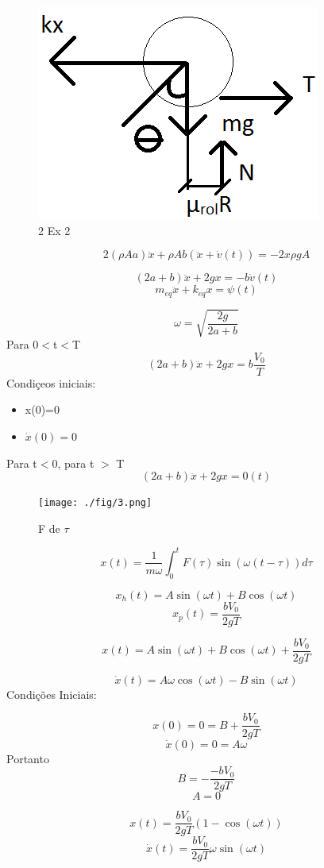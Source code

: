 \documentclass[a4paper, 12pt]{article}
\begin{document}
\begin{figure}[h]
\begin{center}
\includegraphics[scale=0.16]{./fig/2.png}
\caption{\label{fig:1}2 Ex 2} 
\end{center}
\end{figure}

\[2(\rho A a)\ddot{x}+\rho A b(\ddot{x}+\dot{v}(t))=-2x\rho gA\]

\[(2a+b)\ddot{x}+2gx=-b\dot{v}(t)\]
\[m_{eq}\ddot{x}+k_{eq}x=\psi(t)\]

\[\omega = \sqrt{\frac{2g}{2a+b}}\]
Para 0$<$t$<$T
\[(2a+b)\ddot{x}+2gx=b\frac{V_{0}}{T}\]
Condiçeos iniciais:
\begin{itemize}
\item x(0)=0

\item $\dot{x}(0)=0$
\end{itemize}
Para t$<$0, para t $>$ T
\[(2a+b)\ddot{x}+2gx=0(t)\]
\begin{figure}[h]
\begin{center}
\texttt{[image: ./fig/3.png]}
\caption{\label{fig:1} F de $\tau$} 
\end{center}
\end{figure}

\[x(t)=\frac{1}{m\omega} \int _{0}^{t} {F(\tau)\sin(\omega(t-\tau))d\tau}\]

\[x_{h}(t)=A\sin(\omega t)+B\cos(\omega t)\]
\[x_{p}(t)=\frac{bV_{0}}{2gT}\]

\[x(t)=A\sin(\omega t)+B\cos(\omega t)+\frac{bV_{0}}{2gT}\]

\[\dot{x}(t)=A\omega \cos(\omega t)-B\sin(\omega t)\]
Condições Iniciais:

\[x(0)=0=B+\frac{bV_{0}}{2gT}\]
\[\dot{x}(0)=0=A\omega\]
Portanto
\[B=-\frac{-bV_{0}}{2gT}\]
\[A=0\]

\[x(t)=\frac{bV_{0}}{2gT}(1-\cos(\omega t))\]
\[\dot{x} (t)=\frac{bV_{0}}{2gT}\omega \sin(\omega t)\]
\end{document}

